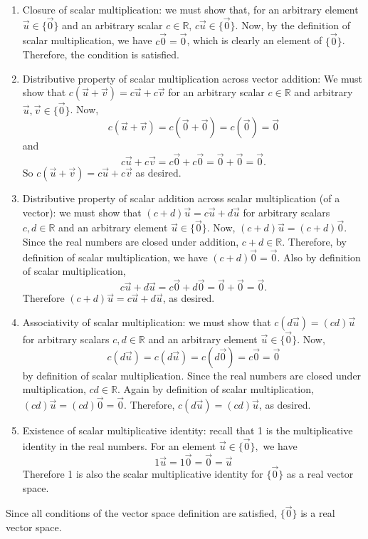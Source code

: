 \documentclass{exam}
\begin{document}
\begin{enumerate}[label=(\alph*)]
    \item Closure of scalar multiplication: we must show that, for an arbitrary element $\Vec{u}\in\{\Vec{0}\}$ and an arbitrary scalar $c\in\mathbb{R}$, $c\Vec{u}\in\{\Vec{0}\}$. Now, by the definition of scalar multiplication, we have $c\Vec{0}=\Vec{0}$, which is clearly an element of $\{\Vec{0}\}$. Therefore, the condition is satisfied. 
    
    \item Distributive property of scalar multiplication across vector addition: We must show that $c(\Vec{u}+\Vec{v})=c\Vec{u}+c\Vec{v}$ for an arbitrary scalar $c\in\mathbb{R}$ and arbitrary $\Vec{u},\Vec{v}\in\{\Vec{0}\}$. Now, $$c(\Vec{u}+\Vec{v})=c(\Vec{0}+\Vec{0})=c(\Vec{0})=\Vec{0}$$ and $$c\Vec{u}+c\Vec{v}=c\Vec{0}+c\Vec{0}=\Vec{0}+\Vec{0}=\Vec{0}.$$ So $c(\Vec{u}+\Vec{v})=c\Vec{u}+c\Vec{v}$ as desired. 
    
    \item Distributive property of scalar addition across scalar multiplication (of a vector): we must show that $(c+d)\Vec{u}=c\Vec{u}+d\Vec{u}$ for arbitrary scalars $c,d\in\mathbb{R}$ and an arbitrary element $\Vec{u}\in\{\Vec{0}\}$. Now, $(c+d)\Vec{u}=(c+d)\Vec{0}$. Since the real numbers are closed under addition, $c+d\in\mathbb{R}$. Therefore, by definition of scalar multiplication, we have $(c+d)\Vec{0}=\Vec{0}$. Also by definition of scalar multiplication, $$c\Vec{u}+d\Vec{u}=c\Vec{0}+d\Vec{0}=\Vec{0}+\Vec{0}=\Vec{0}.$$ Therefore $(c+d)\Vec{u}=c\Vec{u}+d\Vec{u}$, as desired. 
    
    \item Associativity of scalar multiplication: we must show that $c(d\Vec{u})=(cd)\Vec{u}$ for arbitrary scalars $c,d\in\mathbb{R}$ and an arbitrary element $\Vec{u}\in\{\Vec{0}\}$. Now, $$c(d\Vec{u})=c(d\Vec{u})=c(d\Vec{0})=c\Vec{0}=\Vec{0}$$ by definition of scalar multiplication. Since the real numbers are closed under multiplication, $cd\in\mathbb{R}$. Again by definition of scalar multiplication, $(cd)\Vec{u}=(cd)\Vec{0}=\Vec{0}$. Therefore, $c(d\Vec{u})=(cd)\Vec{u}$, as desired. 
    
    \item Existence of scalar multiplicative identity: recall that 1 is the multiplicative identity in the real numbers. For an element $\Vec{u}\in\{\Vec{0}\},$ we have $$1\Vec{u}=1\Vec{0}=\Vec{0}=\Vec{u}$$ Therefore 1 is also the scalar multiplicative identity for $\{\Vec{0}\}$ as a real vector space.
\end{enumerate}

Since all conditions of the vector space definition are satisfied, $\{\Vec{0}\}$ is a real vector space.
\end{document}
